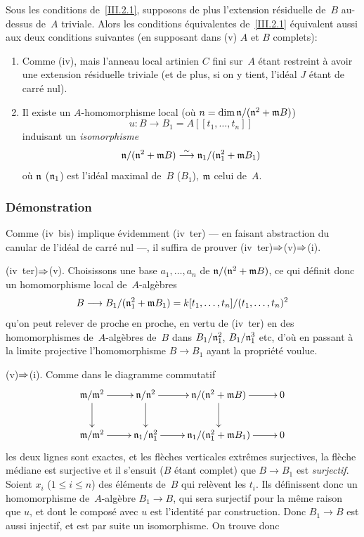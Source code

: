 \begin{corollaire}
\label{III.2.2}
Sous les conditions de~\ref{III.2.1}, supposons de plus l'extension
r\'esiduelle de~$B$ au-dessus de~$A$ triviale. Alors les conditions
\'equivalentes
de~\ref{III.2.1} \'equivalent aussi aux deux conditions suivantes
(en supposant dans \textup{(v)} $A$ et $B$ complets):
\begin{enumerate}
\item[(iv~ter)] Comme \textup{(iv)}, mais l'anneau local artinien $C$ fini sur~$A$ \'etant restreint \`a avoir une extension r\'esiduelle
triviale (et de plus, si on y tient, l'id\'eal $J$ \'etant de
carr\'e nul).
\item[(v)] Il existe un $A$-homomorphisme local (o\`u $n =
\dim{\mathfrak{n}/(\mathfrak{n}^2+\mathfrak{m}B})$)
$$
u \colon B \to B_1 = A[[t_1, \dots, t_n]]
$$
induisant un \emph{isomorphisme}
$$
\mathfrak{n}/(\mathfrak{n}^2+\mathfrak{m}B) \overset{\sim}{\longrightarrow}
\mathfrak{n}_1/(\mathfrak{n}_1^2+\mathfrak{m}B_1)
$$
o\`u $\mathfrak{n}$ ($\mathfrak{n}_1$) est l'id\'eal maximal de~$B$
($B_1$), $\mathfrak{m}$ celui de~$A$.
\end{enumerate}
\end{corollaire}

\subsubsection*{D\'emonstration} Comme (iv~bis) implique \'evidemment (iv~ter) --- en faisant abstraction du canular de l'id\'eal de carr\'e nul ---,
il suffira de prouver (iv~ter)$\To$(v)$\To$(i).

(iv~ter)$\To$(v). Choisissons une base $a_1,\dots,a_n$ de
$\mathfrak{n}/(\mathfrak{n}^2+\mathfrak{m}B)$, ce qui d\'efinit donc un
homomorphisme local de~$A$-alg\`ebres
$$
B \to B_1/(\goth{n}_1^2+\goth{m}B_1) = k[t_1, \dots, t_n]/(t_1, \dots,
t_n)^2
$$
qu'on peut relever de proche en proche, en vertu de (iv~ter) en des
homomorphismes de~$A$-alg\`ebres de~$B$ dans $B_1/\mathfrak{n}_1^2$,
$B_1/\mathfrak{n}_1^3$ etc, d'o\`u en passant \`a la limite projective
l'homomorphisme $B \to B_1$ ayant la propri\'et\'e voulue.

(v)$\To$(i). Comme dans le diagramme commutatif
$$
\xymatrix{{\goth{m}/\goth{m}^2}\ar[r]\ar[d]&{\goth{n}/\goth{n}^2}\ar[r]\ar[d]&{\goth{n}/(\goth{n}^2+\goth{m}B)}\ar[r]\ar[d]&{0}\\{\goth{m}/\goth{m}^2}\ar[r]&{\goth{n}_1/\goth{n}_1^2}\ar[r]&{\goth{n}_1/(\goth{n}_1^2+\goth{m}B_1)}\ar[r]&{0}}
$$
les deux lignes sont exactes, et les fl\`eches verticales
extr\^emes surjectives, la fl\`eche m\'ediane est surjective et
il s'ensuit ($B$ \'etant complet) que $B \to B_1$ est
\emph{surjectif}. Soient $x_i$ ($1 \leq i \leq n$) des
\'el\'ements de~$B$ qui rel\`event les $t_i$. Ils
d\'efinissent donc un homomorphisme de~$A$-alg\`ebre $B_1 \to B$,
qui sera surjectif pour la m\^eme raison que $u$, et dont le
compos\'e avec $u$ est l'identit\'e par construction. Donc $B_1
\to B$ est aussi injectif, et est par suite un isomorphisme. On trouve
donc

